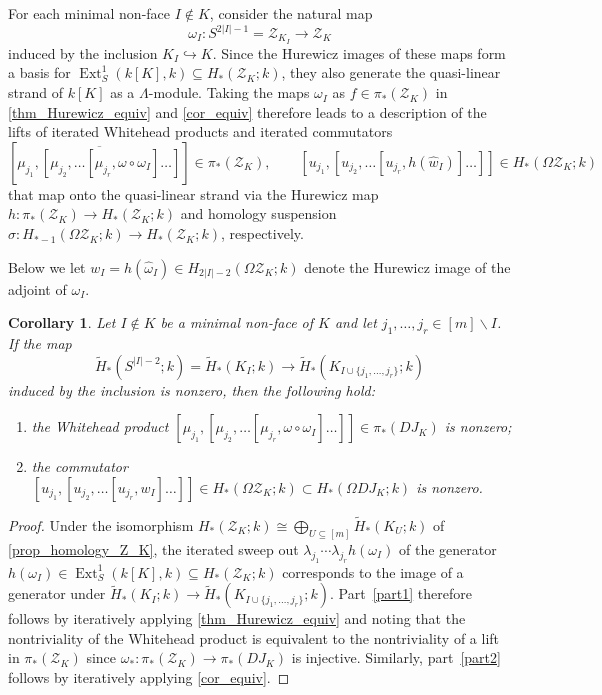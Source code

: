 \documentclass[a4paper,10pt]{amsart}
\newtheorem{corollary}[theorem]{Corollary}
\theoremstyle{definition}
\theoremstyle{remark}
\DeclareMathOperator{\Ext}{Ext}
\begin{document}
For each minimal non-face $I\notin K$, consider the natural map
\[
\omega_I\colon S^{2|I|-1} = \mathcal{Z}_{K_I} \to \mathcal{Z}_K
\]
induced by the inclusion $K_I \hookrightarrow K$. Since the Hurewicz images of these maps form a basis for $\Ext_S^1(k[K],k) \subseteq H_*(\mathcal{Z}_K;k)$, they also generate the quasi-linear strand of $k[K]$ as a $\Lambda$-module. 
Taking the maps $\omega_I$ as $f\in\pi_*(\mathcal{Z}_K)$ in \cref{thm_Hurewicz_equiv} and \cref{cor_equiv} therefore leads to a description of the lifts of iterated Whitehead products and iterated commutators
\[
[\overline{\mu_{j_1},[\mu_{j_2},\ldots[\mu_{j_r},\omega\circ\omega_I]\ldots]}] \in \pi_*(\mathcal{Z}_K), \qquad
[u_{j_1},[u_{j_2},\ldots[u_{j_r},h(\hat{w}_I)]\ldots]] \in H_*(\Omega\mathcal{Z}_K;k)
\]
that map onto the quasi-linear strand via the Hurewicz map $h\colon \pi_*(\mathcal{Z}_K) \to H_*(\mathcal{Z}_K;k)$ and homology suspension $\sigma\colon H_{*-1}(\Omega\mathcal{Z}_K;k) \to H_*(\mathcal{Z}_K;k)$, respectively.

Below we let $w_I = h(\hat{\omega}_I) \in H_{2|I|-2}(\Omega\mathcal{Z}_K;k)$
denote the Hurewicz image of the adjoint of $\omega_I$.

\begin{corollary} \label{cor_brackets}
Let $I\notin K$ be a minimal non-face of $K$ and let $j_1,\ldots,j_r \in [m]\smallsetminus I$. If the map
\[ 
\widetilde{H}_*(S^{|I|-2};k)=\widetilde{H}_*(K_I;k) \longrightarrow \widetilde{H}_*(K_{I\cup \{j_1,\ldots, j_r\}};k) 
\]
induced by the inclusion is nonzero, then the following hold: 
\begin{enumerate}[label={\normalfont(\arabic*)}]
\item the Whitehead product $[\mu_{j_1},[\mu_{j_2},\ldots[\mu_{j_r},\omega\circ\omega_I]\ldots]] \in \pi_*(DJ_K)$ is nonzero; \label{part1}
\item the commutator $[u_{j_1},[u_{j_2},\ldots[u_{j_r},w_I]\ldots]] \in H_*(\Omega \mathcal{Z}_K;k)\subset H_*(\Omega DJ_K;k)$ 
is nonzero. \label{part2}
\end{enumerate}
\end{corollary}

\begin{proof}
Under the isomorphism $H_*(\mathcal{Z}_K;k) \cong \bigoplus_{U\subseteq[m]}\widetilde{H}_*(K_U;k)$ of \cref{prop_homology_Z_K}, the iterated sweep out $\lambda_{j_1}\!\cdots\lambda_{j_r}h(\omega_I)$ of the generator $h(\omega_I) \in \Ext^1_S(k[K],k) \subseteq H_*(\mathcal{Z}_K;k)$ corresponds to the image of a generator under $\widetilde{H}_*(K_I;k) \to \widetilde{H}_*(K_{I\cup \{j_1,\ldots, j_r\}};k)$. Part~\ref{part1} therefore follows by iteratively applying \cref{thm_Hurewicz_equiv} and noting that the nontriviality of the Whitehead product is equivalent to the nontriviality of a lift in $\pi_*(\mathcal{Z}_K)$ since $\omega_*\colon \pi_*(\mathcal{Z}_K) \to \pi_*(DJ_K)$ is injective. Similarly, part~\ref{part2} follows by iteratively applying \cref{cor_equiv}.
\end{proof}
\end{document}
